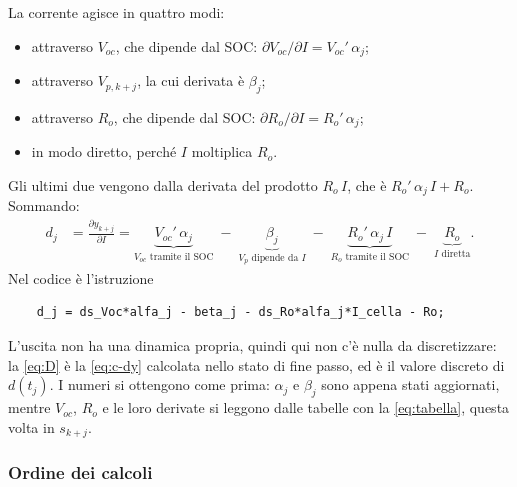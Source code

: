 \documentclass[11pt,a4paper]{article}
\begin{document}
La corrente agisce in quattro modi:
\begin{itemize}
  \item attraverso $V_{oc}$, che dipende dal SOC:
        $\partial V_{oc}/\partial I = V_{oc}'\,\alpha_j$;
  \item attraverso $V_{p,k+j}$, la cui derivata è $\beta_j$;
  \item attraverso $R_o$, che dipende dal SOC:
        $\partial R_o/\partial I = R_o'\,\alpha_j$;
  \item in modo diretto, perché $I$ moltiplica $R_o$.
\end{itemize}
Gli ultimi due vengono dalla derivata del prodotto $R_o\,I$, che è
$R_o'\,\alpha_j\,I + R_o$. Sommando:
\begin{equation}
\begin{aligned}
  d_j &= \frac{\partial y_{k+j}}{\partial I}
      = \underbrace{V_{oc}'\,\alpha_j}_{V_{oc} \text{ tramite il SOC}}
        \;-\; \underbrace{\beta_j}_{V_p \text{ dipende da } I}
        \;-\; \underbrace{R_o'\,\alpha_j\,I}_{R_o \text{ tramite il SOC}}
        \;-\; \underbrace{R_o}_{I \text{ diretta}} .
\end{aligned}
\label{eq:D}
\end{equation}
Nel codice è l'istruzione
{\small
\begin{verbatim}
    d_j = ds_Voc*alfa_j - beta_j - ds_Ro*alfa_j*I_cella - Ro;
\end{verbatim}
}
\noindent
L'uscita non ha una dinamica propria, quindi qui non c'è nulla da discretizzare: la
\eqref{eq:D} è la \eqref{eq:c-dy} calcolata nello stato di fine passo, ed è il
valore discreto di $d(t_j)$. I numeri si ottengono come prima: $\alpha_j$ e
$\beta_j$ sono appena stati aggiornati, mentre $V_{oc}$, $R_o$ e le loro
derivate si leggono dalle tabelle con la \eqref{eq:tabella}, questa volta in
$s_{k+j}$.

\subsubsection{Ordine dei calcoli}
\end{document}
